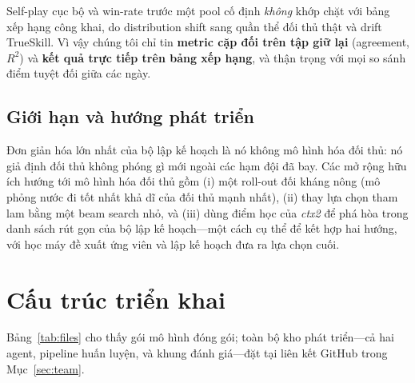 \documentclass[conference]{IEEEtran}
\begin{document}
Self-play cục bộ và win-rate trước một pool cố định \emph{không} khớp chặt với bảng xếp hạng công khai, do distribution shift sang quần thể đối thủ thật và drift TrueSkill. Vì vậy chúng tôi chỉ tin \textbf{metric cặp đối trên tập giữ lại} (agreement, $R^2$) và \textbf{kết quả trực tiếp trên bảng xếp hạng}, và thận trọng với mọi so sánh điểm tuyệt đối giữa các ngày.

\subsection{Giới hạn và hướng phát triển}

Đơn giản hóa lớn nhất của bộ lập kế hoạch là nó không mô hình hóa đối thủ: nó giả định đối thủ không phóng gì mới ngoài các hạm đội đã bay. Các mở rộng hữu ích hướng tới mô hình hóa đối thủ gồm (i) một roll-out đối kháng nông (mô phỏng nước đi tốt nhất khả dĩ của đối thủ mạnh nhất), (ii) thay lựa chọn tham lam bằng một beam search nhỏ, và (iii) dùng điểm học của \textit{ctx2} để phá hòa trong danh sách rút gọn của bộ lập kế hoạch---một cách cụ thể để kết hợp hai hướng, với học máy đề xuất ứng viên và lập kế hoạch đưa ra lựa chọn cuối.

\section{Cấu trúc triển khai}

Bảng~\ref{tab:files} cho thấy gói mô hình đóng gói; toàn bộ kho phát triển---cả hai agent, pipeline huấn luyện, và khung đánh giá---đặt tại liên kết GitHub trong Mục~\ref{sec:team}.
\end{document}
